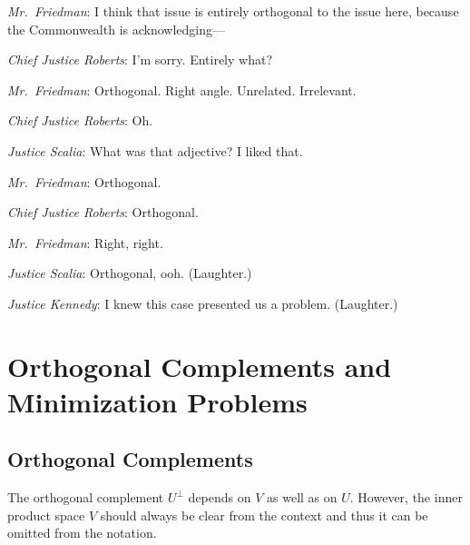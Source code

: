 \vfill


\textit{Mr.~Friedman}: I think that issue is entirely orthogonal to the issue here,
because the Commonwealth is acknowledging---

\textit{Chief Justice Roberts}: I'm sorry. Entirely what?

\textit{Mr.~Friedman}: Orthogonal. Right angle. Unrelated. Irrelevant.

\textit{Chief Justice Roberts}: Oh.

\textit{Justice Scalia}: What was that adjective? I liked that.

\textit{Mr.~Friedman}: Orthogonal.

\textit{Chief Justice Roberts}: Orthogonal.

\textit{Mr.~Friedman}: Right, right.

\textit{Justice Scalia}: Orthogonal, ooh.
(Laughter.)

\textit{Justice Kennedy}: I knew this case presented us a problem.
(Laughter.)

\section{Orthogonal Complements and Minimization Problems} \label{OrthoMin}

\subsection{Orthogonal Complements}


The orthogonal complement $U^\perp$ depends on $V$ as well as on $U$. However, the inner product space $V$ should always be clear from the context and thus it can be omitted from the notation.

